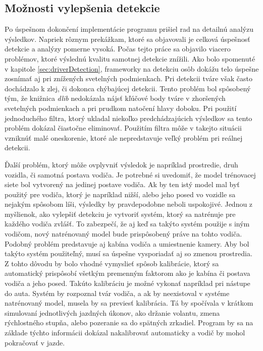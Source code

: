 \documentclass[slovak,master,dept460,male,cpp,cpdeclaration]{diploma}
\begin{document}
\newpage
\subsection{Možnosti vylepšenia detekcie}
\label{sec:Možnosti vylepšenia detekcie}
Po úspešnom dokončení implementácie programu prišiel rad na detailnú analýzu výsledkov. Napriek  rôznym prekážkam, ktoré sa objavovali je celková úspešnosť detekcie a analýzy pomerne vysoká. Počas tejto práce sa objavilo viacero problémov, ktoré výslednú kvalitu samotnej detekcie  znížili. Ako bolo spomenuté v kapitole \ref{sec:driverDetection}, frameworky na detekciu osôb dokážu telo úspešne zosnímať aj pri  znížených svetelných podmienkach. Pri detekcii tváre však  často dochádzalo k zlej, či dokonca chýbajúcej detekcii. Tento problém  bol spôsobený tým, že knižnica \textit{dlib} nedokázala nájsť kľúčové body tváre v zhoršených svetelných podmienkach a pri prudkom natočení hlavy doboku. Pri použití jednoduchého filtra, ktorý ukladal  niekoľko predchádzajúcich výsledkov sa tento problém dokázal čiastočne eliminovať. Použitím filtra môže  v takejto situácii vzniknúť malé oneskorenie, ktoré ale nepredstavuje veľký problém pri reálnej detekcii.\par
Ďalší problém, ktorý môže ovplyvniť výsledok je napríklad prostredie, druh vozidla, či samotná postava vodiča. Je potrebné si uvedomiť, že model trénovacej siete bol vytvorený na jedinej postave vodiča. Ak by ten istý model mal byť použitý pre vodiča, ktorý je napríklad nižší, alebo jeho posed vo vozidle sa nejakým spôsobom líši, výsledky by pravdepodobne neboli uspokojivé. Jednou z myšlienok, ako vylepšiť detekciu je  vytvoriť systém, ktorý  sa natrénuje pre každého vodiča zvlášť. To zabezpečí, že aj keď sa takýto systém použije s iným vodičom,  nový natrénovaný model bude prispôsobený práve na tohto vodiča. Podobný problém predstavuje aj kabína vodiča a umiestnenie kamery. Aby bol takýto systém použiteľný, musí sa úspešne vysporiadať aj so zmenou prostredia. Z tohto dôvodu by bolo vhodné vymyslieť spôsob kalibrácie, ktorý sa automatický prispôsobí všetkým premenným faktorom ako je kabína či postava vodiča a jeho posed. Takúto kalibráciu je možné vykonať napríklad pri nástupe do auta. Systém by rozpoznal tvár vodiča, a ak by neexistoval v systéme natrénovaný model, musela by sa previesť kalibrácia. Tá by spočívala v krátkom simulovaní jednotlivých jazdných  úkonov, ako držanie volantu, zmena rýchlostného stupňa, alebo pozeranie sa do spätných zrkadiel. Program by sa na základe týchto informácii dokázal nakalibrovať automaticky a vodič by mohol pokračovať v jazde. 
\end{document}
